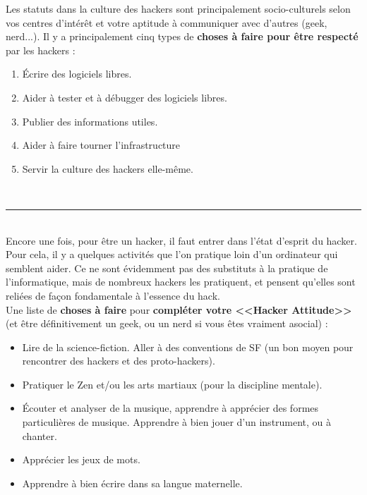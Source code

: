 \documentclass[11pt,twoside,a4paper]{article}
\begin{document}
Les statuts dans la culture des hackers sont principalement socio-culturels selon vos centres d'int{\'e}r{\^e}t et votre aptitude {\`a} communiquer avec d'autres (geek, nerd...). Il y a principalement cinq types de \textbf{choses {\`a} faire pour {\^e}tre respect{\'e}} par les hackers : 
\begin{enumerate}
	\item {\'E}crire des logiciels libres. 
	\item Aider {\`a} tester et {\`a} d{\'e}bugger des logiciels libres. 
	\item Publier des informations utiles. 
	\item Aider {\`a} faire tourner l'infrastructure
	\item Servir la culture des hackers elle-m{\^e}me.
\end{enumerate}~\\

\rule{10cm}{0.5mm}~\\

Encore une fois, pour {\^e}tre un hacker, il faut entrer dans l'{\'e}tat d'esprit du hacker. Pour cela, il y a quelques activit{\'e}s que l'on pratique loin d'un ordinateur qui semblent aider. Ce ne sont {\'e}videmment pas des substituts {\`a} la pratique de l'informatique, mais de nombreux hackers les pratiquent, et pensent qu'elles sont reli{\'e}es de fa\c{c}on fondamentale {\`a} l'essence du hack.~\\


Une liste de \textbf{choses {\`a} faire} pour \textbf{compl{\'e}ter votre <<Hacker Attitude>>} (et {\^e}tre d{\'e}finitivement un geek, ou un nerd si vous {\^e}tes vraiment asocial) : 
\begin{itemize}
	\item Lire de la science-fiction. Aller {\`a} des conventions de SF (un bon moyen pour rencontrer des hackers et des proto-hackers). 
	\item Pratiquer le Zen et/ou les arts martiaux (pour la discipline mentale). 
	\item {\'E}couter et analyser de la musique, apprendre {\`a} appr{\'e}cier des formes particuli{\`e}res de musique. Apprendre {\`a} bien jouer d'un instrument, ou {\`a} chanter. 
	\item Appr{\'e}cier les jeux de mots. 
	\item Apprendre {\`a} bien {\'e}crire dans sa langue maternelle. 
\end{itemize}~\\
\end{document}
